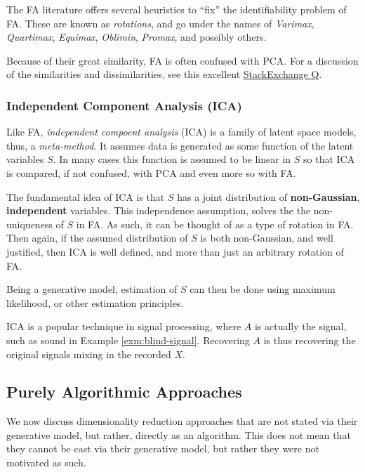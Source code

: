 \documentclass[]{book}
\theoremstyle{definition}
\theoremstyle{definition}
\theoremstyle{definition}
\theoremstyle{remark}
\begin{document}
The FA literature offers several heuristics to ``fix'' the
identifiability problem of FA. These are known as \emph{rotations}, and
go under the names of \emph{Varimax}, \emph{Quartimax}, \emph{Equimax},
\emph{Oblimin}, \emph{Promax}, and possibly others.

Because of their great similarity, FA is often confused with PCA. For a
discussion of the similarities and dissimilarities, see this excellent
\href{https://stats.stackexchange.com/questions/123063/is-there-any-good-reason-to-use-pca-instead-of-efa-also-can-pca-be-a-substitut}{StackExchange
Q}.

\subsubsection{Independent Component Analysis
(ICA)}\label{independent-component-analysis-ica}

Like FA, \emph{independent compoent analysis} (ICA) is a family of
latent space models, thus, a \emph{meta-method}. It assumes data is
generated as some function of the latent variables \(S\). In many cases
this function is assumed to be linear in \(S\) so that ICA is compared,
if not confused, with PCA and even more so with FA.

The fundamental idea of ICA is that \(S\) has a joint distribution of
\textbf{non-Gaussian}, \textbf{independent} variables. This independence
assumption, solves the the non-uniqueness of \(S\) in FA. As such, it
can be thought of as a type of rotation in FA. Then again, if the
assumed distribution of \(S\) is both non-Gaussian, and well justified,
then ICA is well defined, and more than just an arbitrary rotation of
FA.

Being a generative model, estimation of \(S\) can then be done using
maximum likelihood, or other estimation principles.

ICA is a popular technique in signal processing, where \(A\) is actually
the signal, such as sound in Example \ref{exm:blind-signal}. Recovering
\(A\) is thus recovering the original signals mixing in the recorded
\(X\).

\subsection{Purely Algorithmic
Approaches}\label{purely-algorithmic-approaches}

We now discuss dimensionality reduction approaches that are not stated
via their generative model, but rather, directly as an algorithm. This
does not mean that they cannot be cast via their generative model, but
rather they were not motivated as such.
\end{document}
